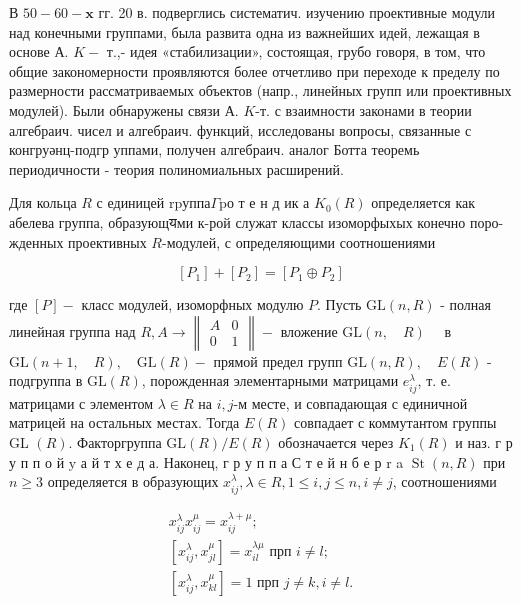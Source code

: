 \documentclass[10pt]{article}
\begin{document}
В $50-60-\mathbf{x}$ гг. 20 в. подверглись систематич. изучению проективные модули над конечными группами, была развита одна из важнейших идей, лежащая в основе А. $K-$ т.,- идея «стабилизации», состоящая, грубо говоря, в том, что общие закономерности проявляются более отчетливо при переходе к пределу по размерности рассматриваемых объектов (напр., линейных групп или проективных модулей). Были обнаружены связи А. $K$-т. с взаимности законами в теории алгебраич. чисел и алгебраич. функций, исследованы вопросы, связанные с конгруәнц-подгр уппами, получен алгебраич. аналог Ботта теоремь периодичности - теория полиномиальных расширений.



Для кольца $R$ с единицей $\mathrm{r} \mathrm{p} \mathrm{у} \mathrm{п} \mathrm{п} \mathrm{а} \Gamma \mathrm{p} о$ т е н д ик а $K_{0}(R)$ определяется как абелева группа, образующयми к-рой служат классы изоморфыхых конечно поро- жденных проективных $R$-модулей, с определяющими соотношениями



\[

\left[P_{1}\right]+\left[P_{2}\right]=\left[P_{1} \oplus P_{2}\right]

\]



где $[P]-$ класс модулей, изоморфных модулю $P$. Пусть $\mathrm{GL}(n, R)$ - полная линейная группа над $R, A \rightarrow\left\|\begin{array}{rr}A & 0 \\ 0 & 1\end{array}\right\|-$ вложение $\mathrm{GL}(n, \quad R) \quad$ в $\mathrm{GL}(n+1, \quad R), \quad \mathrm{GL}(R)-$ прямой предел групп $\mathrm{GL}(n, R), \quad E(R)$ - подгруппа в $\mathrm{GL}(R)$, порожденная элементарными матрицами $e_{i j}^{\lambda}$, т. е. матрицами с элементом $\lambda \in R$ на $i, j$-м месте, и совпадающая с единичной матрицей на остальных местах. Тогда $E(R)$ совпадает с коммутантом группы GL $(R)$. Факторгруппа $\mathrm{GL}(R) / E(R)$ обозначается через $K_{1}(R)$ и наз. г р у п п о й $\mathrm{y}$ а й т х е д а. Наконец, г р у п п а С т е й н б е р r a $\operatorname{St}(n, R)$ при $n \geqslant 3$ определяется в образующих $x_{i j}^{\lambda}, \lambda \in R, 1 \leqslant i, j \leqslant n, i \neq j$, соотношениями



\[

\begin{gathered}

x_{i j}^{\lambda} x_{i j}^{\mu}=x_{i j}^{\lambda+\mu} ; \\

{\left[x_{i j}^{\lambda}, x_{j l}^{\mu}\right]=x_{i l}^{\lambda \mu} \text { прп } i \neq l ;} \\

{\left[x_{i j}^{\lambda}, x_{k l}^{\mu}\right]=1 \text { прп } j \neq k, i \neq l .}

\end{gathered}

\]
\end{document}
